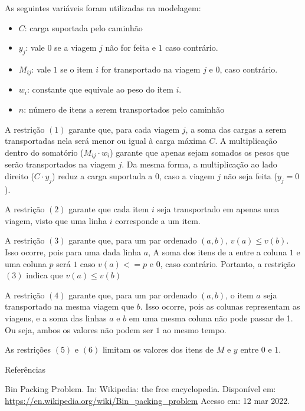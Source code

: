 \documentclass{article}
\begin{document}
As seguintes variáveis foram utilizadas na modelagem:
\begin{itemize}
    \item $C$: carga suportada pelo caminhão
    
    \item $y_j$: vale $0$ se a viagem $j$ não for feita e $1$ caso contrário.

    \item $M_{ij}$: vale $1$ se o item $i$ for transportado na viagem $j$
    e $0$, caso contrário.

    \item $w_i$: constante que equivale ao peso do item $i$.
    
    \item $n$: número de itens a serem transportados pelo caminhão
\end{itemize}

A restrição $(1)$ garante que, para cada viagem $j$, a soma das cargas a serem transportadas nela será menor ou igual à carga máxima $C$. A multiplicação dentro do somatório ($M_{ij} \cdot w_i$) garante que apenas sejam somados os pesos que serão transportados na viagem $j$. Da mesma forma, a multiplicação ao lado direito ($C \cdot y_j$) reduz a carga suportada a $0$, caso a viagem $j$ não seja feita ($y_j = 0$).

A restrição $(2)$ garante que cada item $i$ seja transportado em apenas uma viagem, visto que uma linha $i$ corresponde a um item.

A restrição $(3)$ garante que, para um par ordenado $(a,b)$, $v(a) \le v(b)$. Isso ocorre, pois para uma dada linha $a$, A soma dos itens de a entre a coluna $1$ e uma coluna $p$ será $1$ caso $v(a) <= p$ e $0$, caso contrário. Portanto, a restrição $(3)$ indica que $v(a) \le v(b)$

A restrição $(4)$ garante que, para um par ordenado $(a,b)$, o item $a$ seja transportado na mesma viagem que $b$. Isso ocorre, pois as colunas representam as viagens, e a soma das linhas $a$ e $b$ em uma mesma coluna não pode passar de 1. Ou seja, ambos os valores não podem ser $1$ ao mesmo tempo.

As restrições $(5)$ e $(6)$ limitam os valores dos itens de $M$ e $y$
entre $0$ e $1$.

\begin{section}{Referências}

Bin Packing Problem. In: Wikipedia: the free encyclopedia. Disponível em: \url{https://en.wikipedia.org/wiki/Bin_packing_problem} Acesso em: 12 mar 2022. 

\end{section}
\end{document}
